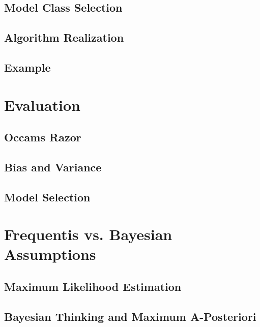 		\subsection{Model Class Selection} %

		\subsection{Algorithm Realization} %

		\subsection{Example} %

	\section{Evaluation} %

		\subsection{Occams Razor} %

		\subsection{Bias and Variance} %

		\subsection{Model Selection} %

	\section{Frequentis vs. Bayesian Assumptions} %

		\subsection{Maximum Likelihood Estimation} %

		\subsection{Bayesian Thinking and Maximum A-Posteriori} %

